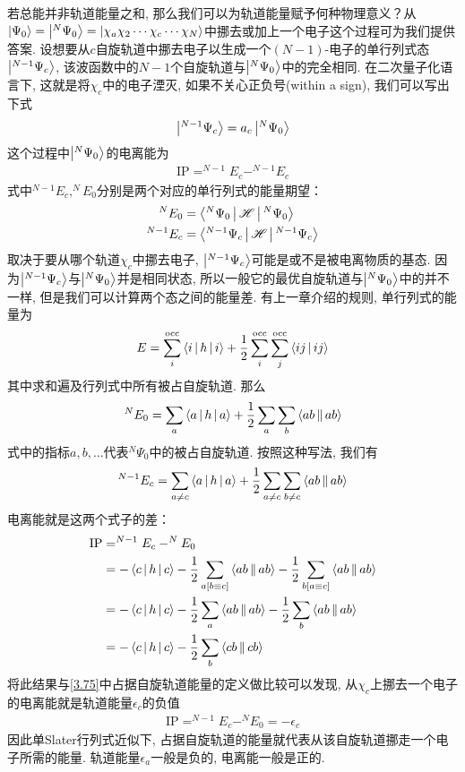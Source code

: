 若总能并非轨道能量之和, 那么我们可以为轨道能量赋予何种物理意义？从$\Ket{\Psi_0}=\Ket{^N\Psi_0}=\Ket{\chi_a\chi_2\cdots\chi_c\cdots\chi_N}$中挪去或加上一个电子这个过程可为我们提供答案. 设想要从$c$自旋轨道中挪去电子以生成一个$(N-1)$-电子的单行列式态$\Ket{^{N-1}\Psi_c}$, 该波函数中的$N-1$个自旋轨道与$\Ket{^N\Psi_0}$中的完全相同. 在二次量子化语言下, 这就是将$\chi_c$中的电子湮灭, 如果不关心正负号(within a sign), 我们可以写出下式
\begin{align}
\Ket{^{N-1}\Psi_c} = a_c\Ket{^N\Psi_0}
\end{align}
这个过程中$\Ket{^N\Psi_0}$的电离能为
\begin{align}
\mathrm{IP} = ^{N-1}E_c - ^{N-1}E_c
\end{align}
式中$^{N-1}E_c,^{N}E_0$分别是两个对应的单行列式的能量期望：
\begin{align}
^{N}E_0 & = \Braket{^N\Psi_0|\mathscr{H}|^N\Psi_0}\\
^{N-1}E_c&= \Braket{^{N-1}\Psi_c|\mathscr{H}|^{N-1}\Psi_c}
\end{align}
取决于要从哪个轨道$\chi_c$中挪去电子, $\Ket{^{N-1}\Psi_c}$可能是或不是被电离物质的基态. 因为$\Ket{^{N-1}\Psi_c}$与$\Ket{^N\Psi_0}$并是相同状态, 所以一般它的最优自旋轨道与$\Ket{^N\Psi_0}$中的并不一样, 但是我们可以计算两个态之间的能量差. 有上一章介绍的规则, 单行列式的能量为
\begin{align}
\label{3.87}
E = \sum_i^\mathrm{occ} \Braket{i|h|i} + \frac{1}{2}\sum^\mathrm{occ}_i\sum^\mathrm{occ}_j\Braket{ij|ij}
\end{align}
其中求和遍及行列式中所有被占自旋轨道. 那么
\begin{align}
\label{3.88}
^NE_0 = \sum_a\Braket{a|h|a} + \frac{1}{2}\sum_a\sum_b\Braket{ab||ab}
\end{align}
式中的指标$a,b,\ldots$代表$^N\Psi_0$中的被占自旋轨道. 按照这种写法, 我们有
\begin{align}
^{N-1}E_c = \sum_{a\neq c}\Braket{a|h|a} + \frac{1}{2}\sum_{a\neq c}\sum_{b\neq c}\Braket{ab||ab}
\end{align}
电离能就是这两个式子的差：
\begin{align}
\mathrm{IP} & = ^{N-1}E_c - ^NE_0\notag\\
            & = -\Braket{c|h|c} - \frac{1}{2}\sum_{a[b\equiv c]}\Braket{ab||ab}- \frac{1}{2}\sum_{b[a\equiv c]}\Braket{ab||ab}\notag\\
            & = -\Braket{c|h|c} - \frac{1}{2}\sum_{a}\Braket{ab||ab}- \frac{1}{2}\sum_{b}\Braket{ab||ab}\notag\\
            & = -\Braket{c|h|c} - \frac{1}{2}\sum_{b}\Braket{cb||cb}
\end{align}
将此结果与\eqref{3.75}中占据自旋轨道能量的定义做比较可以发现, 从$\chi_c$上挪去一个电子的电离能就是轨道能量$\epsilon_c$的负值
\begin{align}
\mathrm{IP} = ^{N-1}E_c - ^NE_0 = -\epsilon_c
\end{align}
因此单Slater行列式近似下, 占据自旋轨道的能量就代表从该自旋轨道挪走一个电子所需的能量. 轨道能量$\epsilon_a$一般是负的, 电离能一般是正的.

